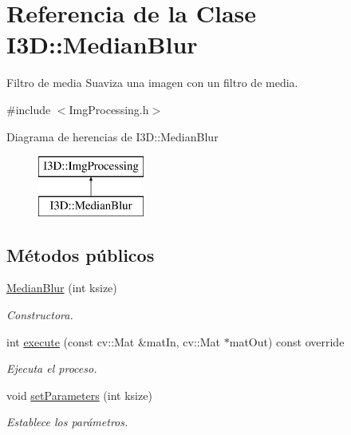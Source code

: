 \hypertarget{class_i3_d_1_1_median_blur}{}\section{Referencia de la Clase I3D\+:\+:Median\+Blur}
\label{class_i3_d_1_1_median_blur}


Filtro de media Suaviza una imagen con un filtro de media.  




{\ttfamily \#include $<$Img\+Processing.\+h$>$}

Diagrama de herencias de I3D\+:\+:Median\+Blur\begin{figure}[H]
\begin{center}
\leavevmode
\includegraphics[height=2.000000cm]{class_i3_d_1_1_median_blur}
\end{center}
\end{figure}
\subsection*{Métodos públicos}
\begin{DoxyCompactItemize}
\item 
\hyperlink{class_i3_d_1_1_median_blur_ad3e65c0ebb97114038d1048340b06f51}{Median\+Blur} (int ksize)
\begin{DoxyCompactList}\small\item\em Constructora. \end{DoxyCompactList}\item 
int \hyperlink{class_i3_d_1_1_median_blur_aae49eae3c8ceda4ba3a2c485d2a64b4d}{execute} (const cv\+::\+Mat \&mat\+In, cv\+::\+Mat $\ast$mat\+Out) const  override
\begin{DoxyCompactList}\small\item\em Ejecuta el proceso. \end{DoxyCompactList}\item 
void \hyperlink{class_i3_d_1_1_median_blur_ac49b2d8067b0486d63723b739a7ee99b}{set\+Parameters} (int ksize)
\begin{DoxyCompactList}\small\item\em Establece los parámetros. \end{DoxyCompactList}\end{DoxyCompactItemize}
